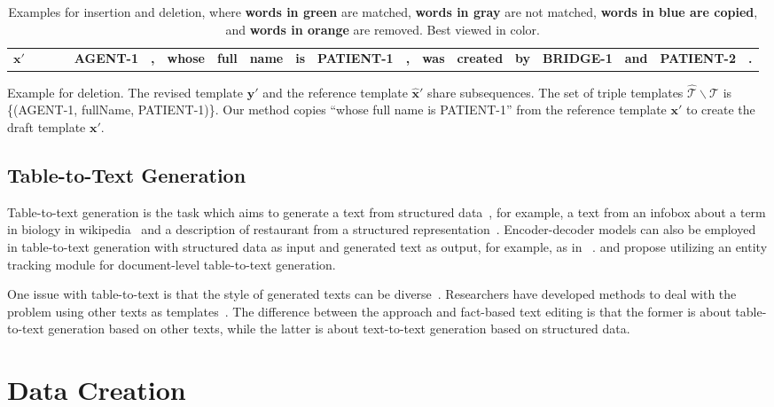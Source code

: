 \documentclass[11pt,a4paper]{article}
\newcommand{\orange}[1]{{\color[HTML]{ff7f0e}\textbf{#1}}}
\newcommand{\blue}[1]{{\color[HTML]{1f77b4}\textbf{#1}}}
\newcommand{\green}[1]{{\color[HTML]{2ca02c}\textbf{#1}}}
\newcommand{\gray}[1]{{\color[HTML]{808080}\textbf{#1}}}
\begin{document}
\begin{table*}[t]
\begin{subtable}[t]{\textwidth}
\begin{tabular*}{\textwidth}{cc@{\quad}c@{\quad}c@{\quad}c@{\quad}c@{\quad}c@{\quad}c@{\quad}c@{\quad}c@{\quad}c@{\quad}c@{\quad}c@{\quad}c@{\quad}c@{\quad}c@{\quad}c@{\quad}c@{\quad}c@{}}
            $\boldsymbol{x}'$     & & & & \green{AGENT-1} & \blue{,} & \blue{whose} & \blue{full} & \blue{name} & \blue{is} & \blue{PATIENT-1} & \blue{,} & \green{was} & \green{created} & \green{by} & \green{BRIDGE-1} & \green{and} & \green{PATIENT-2} & \green{.}\\
        \end{tabular*}
        \caption{Example for deletion. The revised template $\boldsymbol{y}'$ and the reference template $\hat{\boldsymbol{x}}'$ share subsequences. The set of triple templates $\hat{\mathcal{T}}\backslash\mathcal{T}$ is \{(AGENT-1, fullName, PATIENT-1)\}. Our method copies ``whose full name is PATIENT-1'' from the reference template $\boldsymbol{x}'$ to create the draft template $\boldsymbol{x}'$.}
        \label{tab:delete}
    \end{subtable}
    \caption{Examples for insertion and deletion, where \green{words in green} are matched, \gray{words in gray} are not matched, \blue{words in blue are copied}, and \orange{words in orange} are removed. Best viewed in color.}
    \label{tab:edit}
\end{table*}
\subsection{Table-to-Text Generation}
Table-to-text generation is the task which aims to generate a text from structured data~\cite{reiter2000building,gatt2018survey}, for example, a text from an infobox about a term in biology in wikipedia~\cite{lebret2016neural} and a description of restaurant from a structured representation~\cite{novikova2017e2e}. Encoder-decoder models can also be employed in table-to-text generation with structured data as input and generated text as output, for example, as in ~\cite{lebret2016neural}.
\citet{puduppully2019data} and \citet{iso2019learning} propose utilizing an entity tracking module for document-level table-to-text generation.

One issue with table-to-text is that the style of generated texts can be diverse~\cite{iso2019learning}. Researchers have developed methods to deal with the problem using other texts as templates~\cite{hashimoto2018retrieve,guu2018generating,peng2019text}. The difference between the approach and fact-based text editing is that the former is about table-to-text generation based on other texts, while the latter is about text-to-text generation based on structured data.


\section{Data Creation}
\label{sec:make_data}
\end{document}

